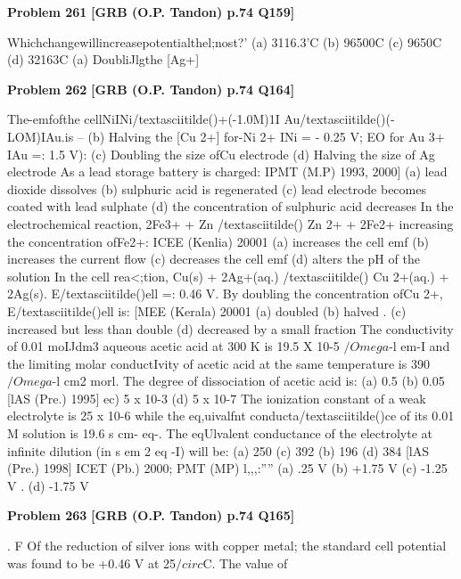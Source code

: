 \begin{problembox}
\textbf{Problem 261} \hfill \textbf{[GRB (O.P. Tandon) p.74 Q159]}
\label{q:ext-grb_all_questions-261}

Whichchangewillincreasepotentialthel;nost?' 
(a) 3116.3'C (b) 96500C (c) 9650C 
(d) 32163C 
(a) DoubliJlgthe [Ag+]
\end{problembox}

\begin{problembox}
\textbf{Problem 262} \hfill \textbf{[GRB (O.P. Tandon) p.74 Q164]}
\label{q:ext-grb_all_questions-262}

The-emfofthe cellNiINi/textasciitilde()+(-1.0M)1I Au/textasciitilde()(-LOM)IAu.is --
(b) Halving the [Cu 2+] 
for-Ni 2+ INi = - 0.25 V; EO for Au 3+ IAu =: 1.5 V): 
(c) Doubling the size ofCu electrode 
(d) Halving the size of Ag electrode 
As a lead storage battery is charged: IPMT (M.P) 1993, 2000] 
(a) lead dioxide dissolves 
(b) sulphuric acid is regenerated 
(c) lead electrode becomes coated with lead sulphate 
(d) the concentration of sulphuric acid decreases 
In the electrochemical reaction, 
2Fe3+ + Zn /textasciitilde() 
Zn 2+ + 2Fe2+ 
increasing the concentration ofFe2+: 
ICEE (Kenlia) 20001 
(a) increases the cell emf 
(b) increases the current flow 
(c) decreases the cell emf 
(d) alters the pH of the solution 
In the cell rea<;tion, 
Cu(s) + 2Ag+(aq.) /textasciitilde() 
Cu 2+(aq.) + 2Ag(s). 
E/textasciitilde()ell =: 0.46 V. By doubling the concentration ofCu 2+, E/textasciitilde()ell 
is: 
[MEE (Kerala) 20001 
(a) doubled 
(b) halved 
. (c) increased but less than double 
(d) decreased by a small fraction 
The conductivity of 0.01 moIJdm3 aqueous acetic acid at 300 
K 
is 19.5 X 10-5 $/Omega$-l em-I 
and the limiting molar 
conductIvity of acetic acid at the same temperature is 390 
$/Omega$-l cm2 morl. The degree of dissociation of acetic acid is: 
(a) 0.5 
(b) 0.05 
[lAS (Pre.) 1995] 
ec) 5 x 10-3 
(d) 5 x 10-7 
The ionization constant of a weak electrolyte is 25 x 10-6 
while the eq,uivalfnt conducta/textasciitilde()ce of its 0.01 M solution is 
19.6 s cm- eq-. The eqUlvalent conductance of the 
electrolyte at infinite dilution (in s em 2 eq -I) will be: 
(a) 250 
(c) 392 
(b) 196 
(d) 384 
[lAS (Pre.) 1998] 
ICET (Pb.) 2000; PMT (MP) l,,,:'''' 
(a) 
.25 V 
(b) +1.75 V (c) -1.25 V . (d) -1.75 V
\end{problembox}

\begin{problembox}
\textbf{Problem 263} \hfill \textbf{[GRB (O.P. Tandon) p.74 Q165]}
\label{q:ext-grb_all_questions-263}

. F Of the reduction of silver ions with copper metal; the standard 
cell potential was found to be +0.46 V at 25$/circ$C. The value of
\end{problembox}

